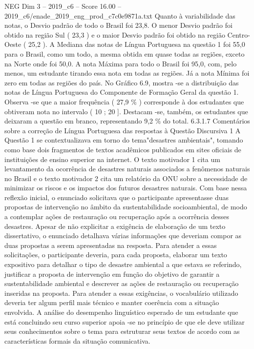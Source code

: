 \begin{textsample}{NEG Dim 3 – 2019\_c6 – Score 16.00 – 2019\_c6/enade\_2019\_eng\_prod\_c7c0e9871a.txt}
Quanto à variabilidade das notas, o Desvio padrão de todo o Brasil foi 23,8.
O menor Desvio padrão foi obtido na região Sul ( 23,3 ) e o maior Desvio padrão foi obtido na região Centro-Oeste ( 25,2 ).
A Mediana das notas de Língua Portuguesa na questão 1 foi 55,0 para o Brasil, como um todo, a mesma obtida em quase todas as regiões, exceto na Norte onde foi 50,0.
A nota Máxima para todo o Brasil foi 95,0, com, pelo menos, um estudante tirando essa nota em todas as regiões.
Já a nota Mínima foi zero em todas as regiões do país.
No Gráfico 6.9, mostra -se a distribuição das notas de Língua Portuguesa do Componente de Formação Geral da questão 1.
Observa -se que a maior frequência ( 27,9 \% ) corresponde à dos estudantes que obtiveram nota no intervalo ( 10 ; 20 ].
Destacam -se, também, os estudantes que deixaram a questão em branco, representando 9,2 \% do total. 6.3.1.7 Comentários sobre a correção de Língua Portuguesa das respostas à Questão Discursiva 1 A Questão 1 se contextualizava em torno do tema"desastres ambientais", tomando como base dois fragmentos de textos acadêmicos publicados em sites oficiais de instituições de ensino superior na internet.
O texto motivador 1 cita um levantamento da ocorrência de desastres naturais associados a fenômenos naturais no Brasil e o texto motivador 2 cita um relatório da ONU sobre a necessidade de minimizar os riscos e os impactos dos futuros desastres naturais.
Com base nessa reflexão inicial, o enunciado solicitava que o participante apresentasse duas propostas de intervenção no âmbito da sustentabilidade socioambiental, de modo a contemplar ações de restauração ou recuperação após a ocorrência desses desastres.
Apesar de não explicitar a exigência de elaboração de um texto dissertativo, o enunciado detalhava várias informações que deveriam compor as duas propostas a serem apresentadas na resposta.
Para atender a essas solicitações, o participante deveria, para cada proposta, elaborar um texto expositivo para detalhar o tipo de desastre ambiental a que estava se referindo, justificar a proposta de intervenção em função do objetivo de garantir a sustentabilidade ambiental e descrever as ações de restauração ou recuperação inseridas na proposta.
Para atender a essas exigências, o vocabulário utilizado deveria ter algum perfil mais técnico e manter coerência com a situação envolvida.
A análise do desempenho linguístico esperado de um estudante que está concluindo seu curso superior apoia -se no princípio de que ele deve utilizar seus conhecimentos sobre o tema para estruturar seus textos de acordo com as características formais da situação comunicativa.

\end{textsample}
